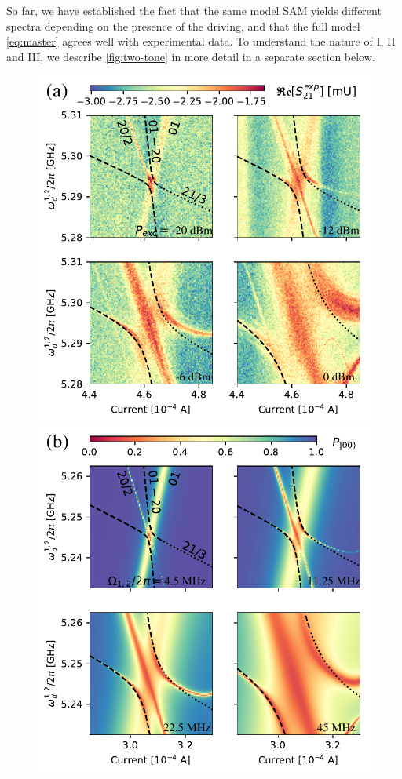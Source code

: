 \documentclass[%
 pra,
 amsmath,amssymb,
 reprint,%
]{revtex4-1}
\begin{document}
So far, we have established the fact that the 
same model SAM yields different spectra depending 
on the presence of the driving, and that the full 
model \autoref{eq:master} agrees well with 
experimental data. To understand the nature of I, 
II and III, we describe \autoref{fig:two-tone} in 
more detail in a separate section below.

\begin{figure}
	\includegraphics[width=.49\linewidth]{powerscan}
	\includegraphics[width=.49\linewidth]{zoom2_picture}
	

\end{figure}
\end{document}
